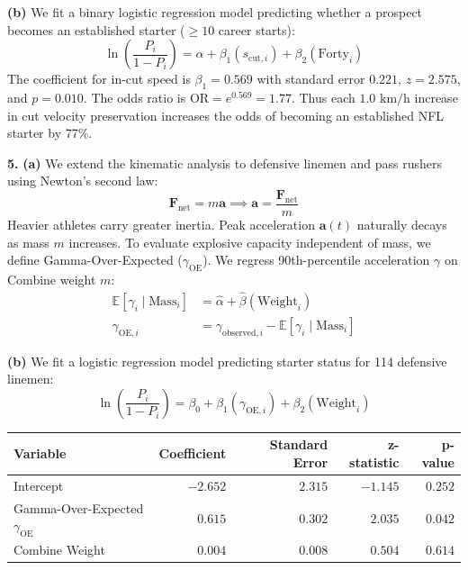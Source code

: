 \documentclass[11pt]{article}
\begin{document}
\noindent\textbf{(b)}
We fit a binary logistic regression model predicting whether a prospect becomes an established starter ($\ge 10$ career starts):
\[ \ln\left(\frac{P_i}{1 - P_i}\right) = \alpha + \beta_1 (s_{\text{cut}, i}) + \beta_2 (\text{Forty}_i) \]
The coefficient for in-cut speed is $\beta_1 = 0.569$ with standard error $0.221$, $z = 2.575$, and $p = 0.010$. The odds ratio is $\text{OR} = e^{0.569} = 1.77$. Thus each $1.0 \text{ km/h}$ increase in cut velocity preservation increases the odds of becoming an established NFL starter by 77\%.

\newpage

\noindent\textbf{5.}
\noindent\textbf{(a)}
We extend the kinematic analysis to defensive linemen and pass rushers using Newton's second law:
\[ \mathbf{F}_{\text{net}} = m \mathbf{a} \implies \mathbf{a} = \frac{\mathbf{F}_{\text{net}}}{m} \]
Heavier athletes carry greater inertia. Peak acceleration $\mathbf{a}(t)$ naturally decays as mass $m$ increases. To evaluate explosive capacity independent of mass, we define Gamma-Over-Expected ($\gamma_{\text{OE}}$). We regress 90th-percentile acceleration $\gamma$ on Combine weight $m$:
\begin{align*}
    \mathbb{E}[\gamma_i \mid \text{Mass}_i] &= \hat{\alpha} + \hat{\beta}(\text{Weight}_i) \\
    \gamma_{\text{OE}, i} &= \gamma_{\text{observed}, i} - \mathbb{E}[\gamma_i \mid \text{Mass}_i]
\end{align*}

\noindent\textbf{(b)}
We fit a logistic regression model predicting starter status for 114 defensive linemen:
\[ \ln\left(\frac{P_i}{1 - P_i}\right) = \beta_0 + \beta_1 (\gamma_{\text{OE}, i}) + \beta_2 (\text{Weight}_i) \]

\begin{center}
\small
\begin{tabular}{lrrrr}
\toprule
\textbf{Variable} & \textbf{Coefficient} & \textbf{Standard Error} & \textbf{z-statistic} & \textbf{p-value} \\
\midrule
Intercept & $-2.652$ & $2.315$ & $-1.145$ & $0.252$ \\
Gamma-Over-Expected $\gamma_{\text{OE}}$ & $0.615$ & $0.302$ & $2.035$ & $0.042$ \\
Combine Weight & $0.004$ & $0.008$ & $0.504$ & $0.614$ \\
\bottomrule
\end{tabular}
\end{center}
\end{document}
